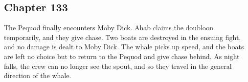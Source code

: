 \subsection{Chapter 133}

The Pequod finally encounters Moby Dick. Ahab claims the doubloon temporarily,
and they give chase. Two boats are destroyed in the ensuing fight, and no
damage is dealt to Moby Dick. The whale picks up speed, and the boats are left
no choice but to return to the Pequod and give chase behind. As night falls,
the crew can no longer see the spout, and so they travel in the general
direction of the whale.
